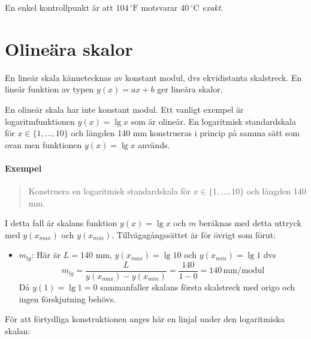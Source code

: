 \documentclass[oneside,11pt,a4paper,swedish]{scrbook}
\newcommand{\startex}[1]{\subsubsection{Exempel}\begin{quote}#1\end{quote}}
\begin{document}
En enkel kontrollpunkt är att $104\, ^\circ\textrm{F}$ motsvarar $40\, ^\circ\textrm{C}$ \emph{exakt}.

\chapter{Olineära skalor} 

En lineär skala kännetecknas av konstant modul, dvs ekvidistanta skalstreck. En lineär funktion av typen $y(x)=ax + b$ ger lineära skalor.

En olineär skala har inte konstant modul. Ett vanligt exempel är  logaritmfunktionen $y(x)=\lg x$ som är olineär. En logaritmisk standardskala för $x \in \{1,...,10\}$ och längden 140 mm konstrueras i princip på samma sätt som ovan men funktionen $y(x)=\lg x$ används.

\startex {Konstruera en logaritmisk standardskala för $x \in \{1,...,10\}$ och längden 140 mm.}

I detta fall är skalans funktion $y(x)=\lg x$ och $m$ beräknas med detta uttryck med $y(x_{max})$ och $y(x_{min})$. Tillvägagångssättet är för övrigt som förut:


\begin{itemize}
\item $m_{lg}$: Här är $L = 140$ mm, $y(x_{max})=\lg 10$  och $y(x_{min})=\lg 1$ dvs  \[m_{lg} = \frac{L}{y(x_{max})-y(x_{min})}= \frac{140}{1-0} = 140\, \textrm{mm/modul}\]
Då $y(1)=\lg 1=0$ sammanfaller skalans första skalstreck med origo och ingen förskjutning behövs. 
\end{itemize}


För att förtydliga konstruktionen anges här en linjal under den logaritmiska skalan:

\end{document}
